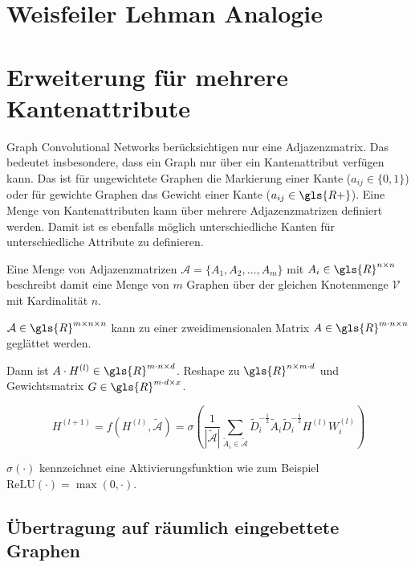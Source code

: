 \section{Weisfeiler Lehman Analogie}

\section{Erweiterung für mehrere Kantenattribute}

Graph Convolutional Networks berücksichtigen nur eine Adjazenzmatrix.
Das bedeutet insbesondere, dass ein Graph nur über ein Kantenattribut verfügen kann.
Das ist für ungewichtete Graphen die Markierung einer Kante ($a_{ij} \in \lbrace 0, 1 \rbrace$) oder für gewichte Graphen das Gewicht einer Kante ($a_{ij} \in \gls{R+}$).
Eine Menge von Kantenattributen kann über mehrere Adjazenzmatrizen definiert werden.
Damit ist es ebenfalls möglich unterschiedliche Kanten für unterschiedliche Attribute zu definieren.

Eine Menge von Adjazenzmatrizen $\mathcal{A} = \lbrace A_1, A_2, \ldots, A_m \rbrace$ mit $A_i \in \gls{R}^{n \times n}$ beschreibt damit eine Menge von $m$ Graphen über der gleichen Knotenmenge $\mathcal{V}$ mit Kardinalität $n$.

$\mathcal{A} \in \gls{R}^{m \times n \times n}$ kann zu einer zweidimensionalen Matrix $A \in \gls{R}^{m \cdot n \times n}$ geglättet werden.

Dann ist $A \cdot H^{(l)} \in \gls{R}^{m \cdot n \times d}$.
Reshape zu $\gls{R}^{n \times m \cdot d}$ und Gewichtsmatrix $G \in \gls{R}^{m \cdot d \times x}$.

\begin{equation}
  H^{(l+1)} = f(H^{(l)}, \mathcal{\tilde A}) = \sigma \left( \frac{1}{|\mathcal{\tilde A}|} \sum_{\tilde A_i \in \mathcal{\tilde A}} \tilde D_i^{-\frac{1}{2}} \tilde A_i \tilde D_i^{-\frac{1}{2}} H^{(l)} W^{(l)}_i \right)
\end{equation}

$\sigma(\cdot)$ kennzeichnet eine Aktivierungsfunktion wie zum Beispiel $\text{ReLU}(\cdot) = \max(0, \cdot)$.

\subsection{Übertragung auf räumlich eingebettete Graphen}

